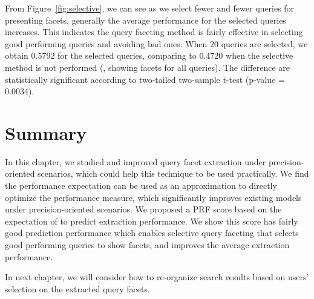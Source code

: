 From Figure~\ref{fig:selective}, we can see as we select fewer and fewer queries for presenting facets, generally the average performance for the selected queries increases. This indicates the query faceting method is fairly effective in selecting good performing queries and avoiding bad ones. When 20 queries are selected, we obtain 0.5792  for the selected queries, comparing to 0.4720 when the selective method is not performed (\ie, showing facets for all queries). The difference are statistically significant according to two-tailed two-sample t-test (p-value = 0.0034). 


\section{Summary}
\label{sec:precision-conclusion}
In this chapter, we studied and improved query facet extraction under precision-oriented scenarios, which could help this technique to be used practically. We find the performance expectation can be used as an approximation to directly optimize the performance measure, which significantly improves existing models under precision-oriented scenarios. We proposed a PRF score based on the expectation of \PRF to predict extraction performance. We show this score has fairly good prediction performance which enables selective query faceting that selects good performing queries to show facets, and improves the average extraction performance.

In next chapter, we will consider how to re-organize search results based on users' selection on the extracted query facets.